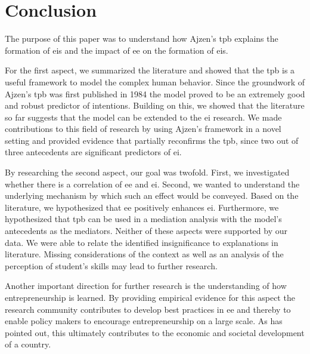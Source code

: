 \chapter{Conclusion}\label{chapter:Conclusion}
The purpose of this paper was to understand how Ajzen's \ac{tpb} explains the formation of \acp{ei} and the impact of \ac{ee} on the formation of \acp{ei}.


For the first aspect, we summarized the literature and showed that the \ac{tpb} is a useful framework to model the complex human behavior. Since the groundwork of Ajzen's \ac{tpb} was first published in 1984 the model proved to be an extremely good and robust predictor of intentions. Building on this, we showed that the literature so far suggests that the model can be extended to the \ac{ei} research. We made contributions to this field of research by using Ajzen's framework in a novel setting and provided evidence that partially reconfirms the \ac{tpb}, since two out of three antecedents are significant predictors of \ac{ei}. 

By researching the second aspect, our goal was twofold. First, we investigated whether there is a correlation of \ac{ee} and \ac{ei}. Second, we wanted to understand the underlying mechanism by which such an effect would be conveyed. Based on the literature, we hypothesized that \ac{ee} positively enhances \ac{ei}. Furthermore, we hypothesized that \ac{tpb} can be used in a mediation analysis with the model's antecedents as the mediators. Neither of these aspects were supported by our data. We were able to relate the identified insignificance to explanations in literature. Missing considerations of the context as well as an analysis of the perception of student's skills may lead to further research.

Another important direction for further research is the understanding of how entrepreneurship is learned. By providing empirical evidence for this aspect the research community contributes to develop best practices in \ac{ee} and thereby to enable policy makers to encourage entrepreneurship on a large scale. As \citet{kuratko2005emergence} has pointed out, this ultimately contributes to the economic and societal development of a country.

